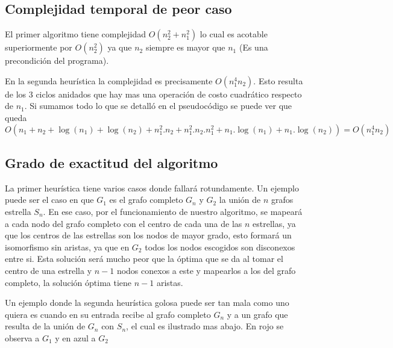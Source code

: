 \subsection{Complejidad temporal de peor caso}

El primer algoritmo tiene complejidad $O(n_2^2 + n_1^2)$ lo cual es acotable superiormente por $O(n_2^2)$ ya que $n_2$ siempre es mayor que $n_1$ (Es una precondición del programa).

En la segunda heurística la complejidad es precisamente $O(n_1^4 n_2)$. Esto resulta de los 3 ciclos anidados que hay mas una operación de costo cuadrático respecto de $n_1$. Si sumamos todo lo que se detalló en el pseudocódigo se puede ver que queda $O(n_1 + n_2 + \log(n_1) + \log(n_2) + n_1^2.n_2 + n_1^2.n_2.n_1^2 + n_1.\log(n_1) + n_1.\log(n_2)) = O(n_1^4 n_2)$

\subsection{Grado de exactitud del algoritmo}

La primer heurística tiene varios casos donde fallará rotundamente. Un ejemplo puede ser el caso en que $G_1$ es el grafo completo $G_n$ y $G_2$ la unión de $n$ grafos estrella $S_n$. En ese caso, por el funcionamiento de nuestro algoritmo, se mapeará a cada nodo del grafo completo con el centro de cada una de las $n$ estrellas, ya que los centros de las estrellas son los nodos de mayor grado, esto formará un isomorfismo sin aristas, ya que en $G_2$ todos los nodos escogidos son disconexos entre
si. Esta solución será mucho peor que la óptima que se da al tomar el centro de una estrella y $n-1$ nodos conexos a este y mapearlos a los del grafo completo, la solución óptima tiene $n-1$ aristas.


Un ejemplo donde la segunda heurística golosa puede ser tan mala como uno quiera es cuando en su entrada recibe al grafo completo $G_n$ y a un grafo que resulta de la unión de $G_n$ con $S_n$, el cual es ilustrado mas abajo. En rojo se observa a $G_1$ y en azul a $G_2$

